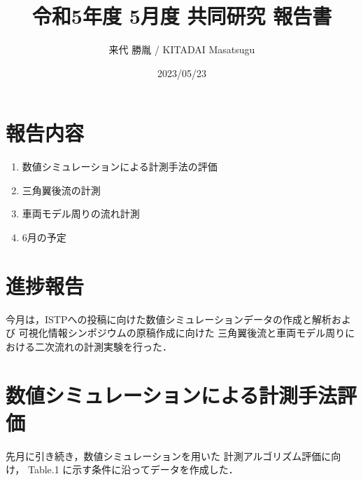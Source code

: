 \documentclass[twocolumn,a4j]{jsarticle}
\author{来代 勝胤 / KITADAI Masatsugu}
\title{令和5年度 5月度 共同研究 報告書}
\date{2023/05/23}
\begin{document}
\columnseprule=0.1mm
\maketitle

\section*{報告内容}
\begin{enumerate}[1.]
  \item 数値シミュレーションによる計測手法の評価
  \item 三角翼後流の計測
  \item 車両モデル周りの流れ計測
  \item 6月の予定
\end{enumerate}

\section*{進捗報告}
今月は，ISTPへの投稿に向けた数値シミュレーションデータの作成と解析および
可視化情報シンポジウムの原稿作成に向けた
三角翼後流と車両モデル周りにおける二次流れの計測実験を行った．

\section{数値シミュレーションによる計測手法評価}
先月に引き続き，数値シミュレーションを用いた
計測アルゴリズム評価に向け，
Table.1 に示す条件に沿ってデータを作成した．\\
\end{document}
